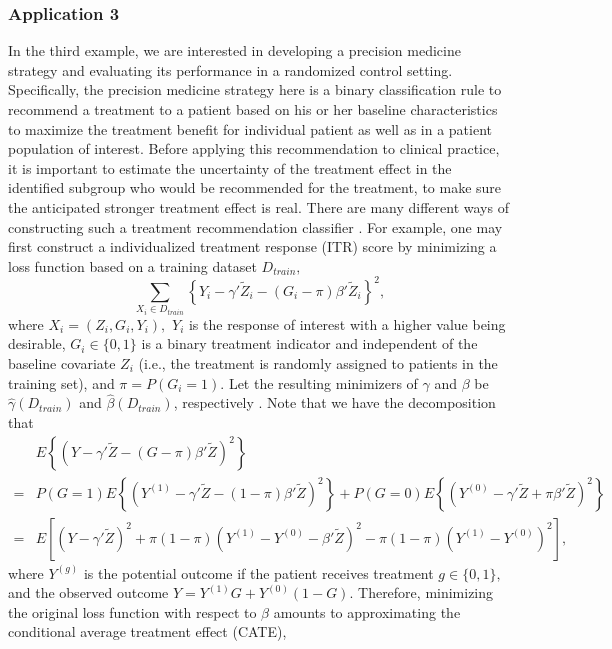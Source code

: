 \documentclass[12pt]{article}
\begin{document}
\subsubsection{Application 3}
In  the third example, we are interested in developing a precision medicine strategy and evaluating its performance in a randomized control setting. Specifically, the precision medicine strategy here is a binary classification rule to recommend a treatment to a patient based on his or her baseline characteristics to maximize the treatment benefit for individual patient as well as in a patient population of interest. Before applying this recommendation to clinical practice, it is important to estimate the uncertainty of the treatment effect in the identified subgroup who would be recommended for the treatment, to make sure the anticipated stronger treatment effect is real. There are many different ways of constructing such a treatment recommendation classifier \cite{chen2017general, tian2014simple}.  For example, one may first construct a individualized treatment response (ITR) score  by minimizing a loss function based on a training dataset $D_{train},$ 
$$\sum_{X_i\in D_{train}} \left\{Y_i-\gamma'\tilde{Z}_i-(G_i-\pi)\beta'\tilde{Z}_i \right\}^2 ,$$
where $X_i=(Z_i,G_i,Y_i),$ $Y_i$ is the response of interest with a higher value being desirable, $G_i \in \{0, 1\}$ is a binary treatment indicator and independent of the baseline covariate $Z_i$ (i.e., the treatment is randomly assigned to patients in the training set), and $\pi=P(G_i=1).$ Let the resulting minimizers of $\gamma$ and $\beta$ be $\hat{\gamma}(D_{train})$ and $\hat{\beta}(D_{train})$, respectively \cite{tian2014simple, yadlowsky2021estimation}.  Note that we have the decomposition that 
\begin{align*}
& E\left\{\left(Y-\gamma'\tilde{Z}-(G-\pi)\beta'\tilde{Z} \right)^2\right\}  \\
=& P(G=1)E\left\{\left(Y^{(1)}-\gamma'\tilde{Z}-(1-\pi)\beta'\tilde{Z} \right)^2\right\}+P(G=0)E\left\{\left(Y^{(0)}-\gamma'\tilde{Z}+\pi\beta'\tilde{Z} \right)^2\right\}\\
=& E\left[ \left(Y-\gamma'\tilde{Z} \right)^2 +\pi(1-\pi) \left(Y^{(1)}-Y^{(0)}-\beta'\tilde{Z}\right)^2-\pi(1-\pi)\left(Y^{(1)}-Y^{(0)}\right)^2  \right],
\end{align*}
where $Y^{(g)}$ is the potential outcome if the patient receives treatment $g \in \{0, 1\},$ and the observed outcome $Y=Y^{(1)}G+Y^{(0)}(1-G).$ 
Therefore, minimizing the original loss function with respect to $\beta$ amounts to approximating the conditional average treatment effect (CATE), 
\end{document}
